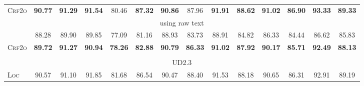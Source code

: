 \begin{table*}[tb]
\begin{tabularx}{\textwidth}{lccccccccccccc}
    \textsc{Crf2o}                    & \textbf{90.77} & \textbf{91.29} & \textbf{91.54}\rlap{$^\dagger$}  & 80.46                           & \textbf{87.32}\rlap{$^\dagger$} & \textbf{90.86}\rlap{$^\dagger$}  & 87.96                           & \textbf{91.91}\rlap{$^\ddagger$} & \textbf{88.62}\rlap{$^\ddagger$} & \textbf{91.02}\rlap{$^\dagger$} & \textbf{86.90}\rlap{$^\ddagger$} & \textbf{93.33}\rlap{$^\ddagger$} & \textbf{89.33}\rlap{$^\ddagger$} \\[1pt]
    \multicolumn{14}{c}{using raw text}                                                                                                                                                                                                                                                                                                                                                                                                                              \\[1pt]
    \citet{ji-etal-2019-graph}        & 88.28          & 89.90          & 89.85                            & 77.09                           & 81.16                           & 88.93                            & 83.73                           & 88.91                            & 84.82                            & 86.33                           & 84.44                            & 86.62                            & 85.83                            \\
    \textsc{Crf2o}                    & \textbf{89.72} & \textbf{91.27} & \textbf{90.94}                   & \textbf{78.26}                  & \textbf{82.88}                  & \textbf{90.79}                   & \textbf{86.33}                  & \textbf{91.02}                   & \textbf{87.92}                   & \textbf{90.17}                  & \textbf{85.71}                   & \textbf{92.49}                   & \textbf{88.13}                   \\
    \hline
    \\[-15pt]
    \multicolumn{14}{c}{UD2.3}                                                                                                                                                                                                                                                                                                                                                                                                                                       \\[1pt]
    \textsc{Loc}                      & 90.57          & 91.10          & 91.85                            & 81.68                           & 86.54                           & 90.47                            & 88.40                           & 91.53                            & 88.18                            & 90.65                           & 86.31                            & 92.91                            & 89.19                            \\

\end{tabularx}
\end{table*}
